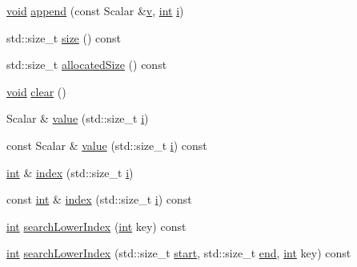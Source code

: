 \begin{DoxyCompactItemize}
\item 
\hyperlink{group___u_a_v_objects_plugin_ga444cf2ff3f0ecbe028adce838d373f5c}{void} \hyperlink{class_compressed_storage_a358593c8de25e9565a55049747252e0b}{append} (const Scalar \&\hyperlink{glext_8h_a14cfbe2fc2234f5504618905b69d1e06}{v}, \hyperlink{ioapi_8h_a787fa3cf048117ba7123753c1e74fcd6}{int} \hyperlink{uavobjecttemplate_8m_a6f6ccfcf58b31cb6412107d9d5281426}{i})
\item 
std\-::size\-\_\-t \hyperlink{class_compressed_storage_a1cedc77fa42d89ae3caa4d92b4b258c5}{size} () const 
\item 
std\-::size\-\_\-t \hyperlink{class_compressed_storage_a64f0e965a66d4cb0fbb246b4d1569f59}{allocated\-Size} () const 
\item 
\hyperlink{group___u_a_v_objects_plugin_ga444cf2ff3f0ecbe028adce838d373f5c}{void} \hyperlink{class_compressed_storage_a4b35d697f23fdb1e0776f2c4f7a3f295}{clear} ()
\item 
Scalar \& \hyperlink{class_compressed_storage_a4abe46174f900f83559885878b9299c6}{value} (std\-::size\-\_\-t \hyperlink{uavobjecttemplate_8m_a6f6ccfcf58b31cb6412107d9d5281426}{i})
\item 
const Scalar \& \hyperlink{class_compressed_storage_acc4eb476a096816be4ad40e7662ec8f4}{value} (std\-::size\-\_\-t \hyperlink{uavobjecttemplate_8m_a6f6ccfcf58b31cb6412107d9d5281426}{i}) const 
\item 
\hyperlink{ioapi_8h_a787fa3cf048117ba7123753c1e74fcd6}{int} \& \hyperlink{class_compressed_storage_aa7fc52b534330a0153b2c7e01071f487}{index} (std\-::size\-\_\-t \hyperlink{uavobjecttemplate_8m_a6f6ccfcf58b31cb6412107d9d5281426}{i})
\item 
const \hyperlink{ioapi_8h_a787fa3cf048117ba7123753c1e74fcd6}{int} \& \hyperlink{class_compressed_storage_ae76c7a1457d67b9f3bd21e0d6508fc66}{index} (std\-::size\-\_\-t \hyperlink{uavobjecttemplate_8m_a6f6ccfcf58b31cb6412107d9d5281426}{i}) const 
\item 
\hyperlink{ioapi_8h_a787fa3cf048117ba7123753c1e74fcd6}{int} \hyperlink{class_compressed_storage_abfd4eec7238c8065b90c68e5013ee549}{search\-Lower\-Index} (\hyperlink{ioapi_8h_a787fa3cf048117ba7123753c1e74fcd6}{int} key) const 
\item 
\hyperlink{ioapi_8h_a787fa3cf048117ba7123753c1e74fcd6}{int} \hyperlink{class_compressed_storage_a8eecf6a328b7fcd4a3f2f25c547f989a}{search\-Lower\-Index} (std\-::size\-\_\-t \hyperlink{glext_8h_a13be19455586e95d5a42ed8f054afad2}{start}, std\-::size\-\_\-t \hyperlink{glext_8h_a432111147038972f06e049e18a837002}{end}, \hyperlink{ioapi_8h_a787fa3cf048117ba7123753c1e74fcd6}{int} key) const 

\end{DoxyCompactItemize}
